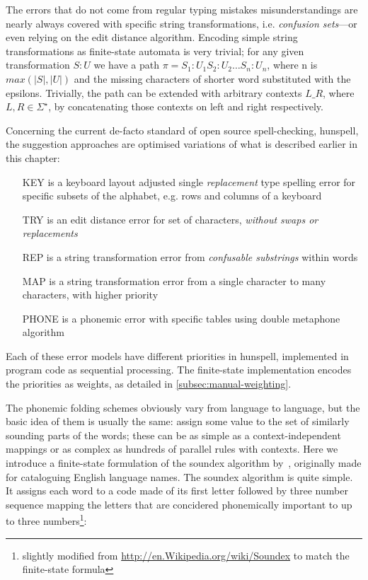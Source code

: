 \documentclass[a4paper,12pt]{article}
\begin{document}
The errors that do not come from regular typing mistakes misunderstandings are
nearly always covered with specific string transformations, i.e.
\emph{confusion sets}---or even relying on the edit distance algorithm.
Encoding simple string transformations as finite-state automata is very
trivial; for any given transformation $S:U$ we have a path $\pi = S_1:U_1
S_2:U_2 \ldots S_n:U_n$, where n is $max(|S|, |U|)$ and the missing characters
of shorter word substituted with the epsilons.  Trivially, the path can be
extended with arbitrary contexts $L \_ R$, where $L, R \in \Sigma^{\star}$, by
concatenating those contexts on left and right respectively. 

Concerning the current de-facto standard of open source spell-checking,
hunspell, the suggestion approaches are optimised variations of what is
described earlier in this chapter:

\begin{itemize}
    \item[KEY] is a keyboard layout adjusted single \emph{replacement} type
        spelling error for specific subsets of the alphabet, e.g. rows and 
        columns of a keyboard
    \item[TRY] is an edit distance error for set of characters, \emph{without
        swaps or replacements}
    \item[REP] is a string transformation error from \emph{confusable
        substrings} within words
    \item[MAP] is a string transformation error from a single character to 
        many characters, with higher priority
    \item[PHONE] is a phonemic error with specific tables using double
        metaphone algorithm
\end{itemize}

Each of these error models have different priorities in hunspell, implemented
in program code as sequential processing. The finite-state implementation
encodes the priorities as weights, as detailed in
\ref{subsec:manual-weighting}.

The phonemic folding schemes obviously vary from language to language, but the
basic idea of them is usually the same: assign some value to the set of
similarly sounding parts of the words; these can be as simple as a
context-independent mappings or as complex as hundreds of parallel rules with
contexts. Here we introduce a finite-state formulation of the soundex algorithm
by~\cite{russell1918soundex}, originally made for cataloguing English language
names. The soundex algorithm is quite simple. It assigns each word to a code
made of its first letter followed by three number sequence mapping the letters
that are concidered phonemically important to up to three
numbers\footnote{slightly modified from
\url{http://en.Wikipedia.org/wiki/Soundex} to match the finite-state formula}:
\end{document}
